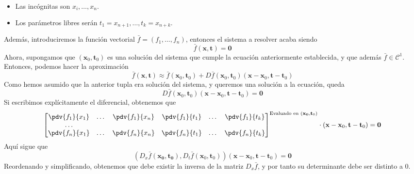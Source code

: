 \documentclass{../Calculo.tex}
\begin{document}
\begin{itemize}
	\item Las incógnitas son $x_{i},\dots ,x_{n}$.
	\item Los parámetros libres serán $t_1=x_{n+1},\dots ,t_{k}=x_{n+k}$. 
\end{itemize}
Además, introduciremos la función vectorial $\bar{f}=(f_1,\dots ,f_{n})$, entonces el sistema a resolver acaba siendo
\[
	\bar{f}(\mathbf{x}, \mathbf{t})=\mathbf{0}
\]
Ahora, supongamos que $(\mathbf{x}_{0}, \mathbf{t}_{0})$ es una solución del sistema que cumple la ecuación anteriormente establecida, y que además $\bar{f} \in \mathcal{C}^{1}$. Entonces, podemos hacer la aproximación
\[
	\bar{f}(\mathbf{x}, \mathbf{t}) \approx \bar{f}(\mathbf{x}_{0}, \mathbf{t}_{0})+D \bar{f}(\mathbf{x}_{0}, \mathbf{t}_{0})(\mathbf{x}-\mathbf{x}_{0}, \mathbf{t}-\mathbf{t}_{0})
\]
Como hemos asumido que la anterior tupla era solución del sistema, y queremos una solución a la ecuación, queda
\[
	D \bar{f}(\mathbf{x}_{0}, \mathbf{t}_{0})(\mathbf{x}-\mathbf{x}_{0},\mathbf{t}-\mathbf{t}_{0})=\mathbf{0}
\]
Si escribimos explícitamente el diferencial, obtenemos que
\[
	\begin{bmatrix}
	
		\pdv{f_1}{x_1}&\dots &\pdv{f_1}{x_{n}} & \pdv{f_1}{t_1}&\dots &\pdv{f_1}{t_{k}}\\
		\dots \\
		\pdv{f_{n}}{x_{1}}&\dots &\pdv{f_{n}}{x_{n}}&\pdv{f_{n}}{t_{1}}&\dots &\pdv{f_{n}}{t_{k}}
	
	\end{bmatrix}^{\text{Evaluado en }(\mathbf{x_{0}}, \mathbf{t}_{0})}\cdot (\mathbf{x}-\mathbf{x}_{0}, \mathbf{t}-\mathbf{t}_{0})= \mathbf{0}
\]
Aquí sigue que
\[
	\left(D_{x} \bar{f}(\mathbf{x_{0}}, \mathbf{t_0}),D_{t}\bar{f}(\mathbf{x}_{0}, \mathbf{t}_{0}) \right)(\mathbf{x}-\mathbf{x}_{0}, \mathbf{t}-\mathbf{t}_{0})=\mathbf{0}
\]
Reordenando y simplificando, obtenemos que debe existir la inversa de la matriz $D_{x} \bar{f}$, y por tanto su determinante debe ser distinto a $0$.
\end{document}
